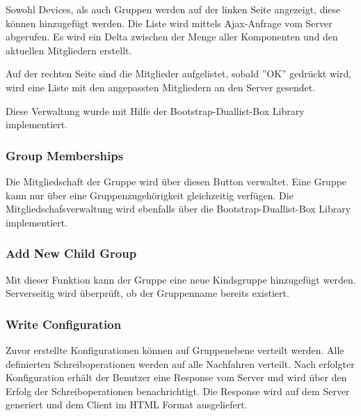 Sowohl Devices, als auch Gruppen werden auf der linken Seite angezeigt, diese können hinzugefügt werden. Die Liste wird mittels Ajax-Anfrage vom Server abgerufen. Es wird ein Delta zwischen der Menge aller Komponenten und den aktuellen Mitgliedern erstellt.

Auf der rechten Seite sind die Mitglieder aufgelistet, sobald ''OK'' gedrückt wird, wird eine Liste mit den angepassten Mitgliedern an den Server gesendet.

Diese Verwaltung wurde mit Hilfe der Bootstrap-Duallist-Box Library implementiert. 
\subsubsection{Group Memberships}
Die Mitgliedschaft der Gruppe wird über diesen Button verwaltet. Eine Gruppe kann nur über eine Gruppenzugehörigkeit gleichzeitig verfügen. Die Mitgliedschafsverwaltung wird ebenfalls über die Bootstrap-Duallist-Box Library implementiert.

\subsubsection{Add New Child Group}
Mit dieser Funktion kann der Gruppe eine neue Kindsgruppe hinzugefügt werden. Serverseitig wird überprüft, ob der Gruppenname bereits existiert.\\
\newpage

\subsubsection{Write Configuration}
Zuvor erstellte Konfigurationen können auf Gruppenebene verteilt werden. Alle definierten Schreiboperationen werden auf alle Nachfahren verteilt. Nach erfolgter Konfiguration erhält der Benutzer eine Response vom Server und wird über den Erfolg der Schreiboperationen benachrichtigt. Die Response wird auf dem Server generiert und dem Client im HTML Format ausgeliefert.

